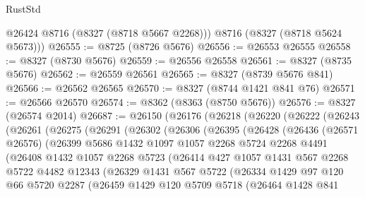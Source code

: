 \begin{lexlean}{RustStd}
\begin{coremodule}
{\begin{coremodule}
{{{{{{{{{{{{{{{{{{{{{{{{{{{{{{{{{{{{{{{{{{{{{{{{{{{{{{        @26424
        @8716
        (@8327 (@8718 @5667 @2268)))
      @8716
      (@8327 (@8718 @5624 @5673)))
@26555 := @8725 (@8726 @5676)
@26556 := @26553 @26555
@26558 := @8327 (@8730 @5676)
@26559 := @26556 @26558
@26561 := @8327 (@8735 @5676)
@26562 := @26559 @26561
@26565 := @8327 (@8739 @5676 @841)
@26566 := @26562 @26565
@26570 := @8327 (@8744 @1421 @841 @76)
@26571 := @26566 @26570
@26574 := @8362 (@8363 (@8750 @5676))
@26576 := @8327 (@26574 @2014)
@26687 := @26150
    (@26176
      (@26218
        (@26220
          (@26222
            (@26243
              (@26261
                (@26275
                  (@26291
                    (@26302
                      (@26306
                        (@26395
                          (@26428
                            (@26436
                              (@26571 @26576)
                              (@26399
                                @5686
                                @1432
                                @1097
                                @1057
                                @2268
                                @5724
                                @2268
                                @4491
                                (@26408
                                  @1432
                                  @1057
                                  @2268
                                  @5723
                                  (@26414
                                    @427
                                    @1057
                                    @1431
                                    @567
                                    @2268
                                    @5722
                                    @4482
                                    @12343
                                    (@26329
                                      @1431
                                      @567
                                      @5722
                                      (@26334
                                        @1429
                                        @97
                                        @120
                                        @66
                                        @5720
                                        @2287
                                        (@26459
                                          @1429
                                          @120
                                          @5709
                                          @5718
                                          (@26464
                                            @1428
                                            @841
}}}}}}}}}}}}}}}}}}}}}}}}}}}}}}}}}}}}}}}}}}}}}}}}}}}}}}
\end{coremodule}}
\end{coremodule}
\end{lexlean}
